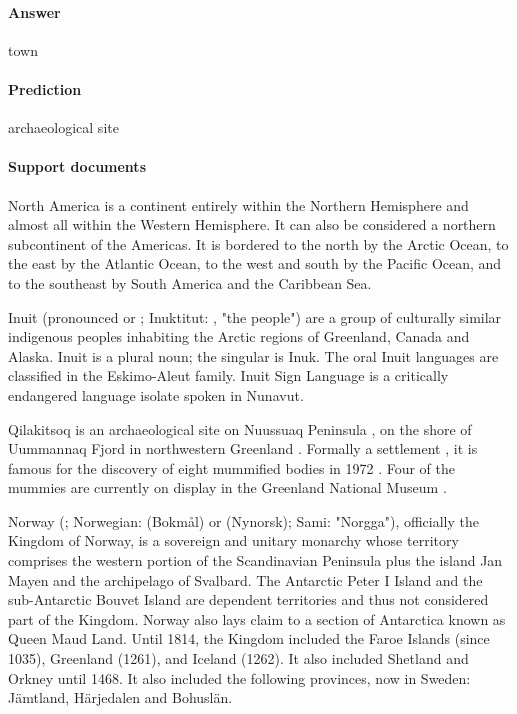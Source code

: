 \documentclass{article} \usepackage{iclr2019_conference,times}
\begin{document}
\paragraph{Answer} town

\paragraph{Prediction} archaeological site

\paragraph{Support documents}

North America is a continent entirely within the Northern Hemisphere and almost all within the Western Hemisphere. It can also be considered a northern subcontinent of the Americas. It is bordered to the north by the Arctic Ocean, to the east by the Atlantic Ocean, to the west and south by the Pacific Ocean, and to the southeast by South America and the Caribbean Sea.

Inuit (pronounced or ; Inuktitut: , "the people") are a group of culturally similar indigenous peoples inhabiting the Arctic regions of Greenland, Canada and Alaska. Inuit is a plural noun; the singular is Inuk. The oral Inuit languages are classified in the Eskimo-Aleut family. Inuit Sign Language is a critically endangered language isolate spoken in Nunavut.

Qilakitsoq is an archaeological site on Nuussuaq Peninsula , on the shore of Uummannaq Fjord in northwestern Greenland . Formally a settlement , it is famous for the discovery of eight mummified bodies in 1972 . Four of the mummies are currently on display in the Greenland National Museum .

Norway (; Norwegian: (Bokmål) or (Nynorsk); Sami: "Norgga"), officially the Kingdom of Norway, is a sovereign and unitary monarchy whose territory comprises the western portion of the Scandinavian Peninsula plus the island Jan Mayen and the archipelago of Svalbard. The Antarctic Peter I Island and the sub-Antarctic Bouvet Island are dependent territories and thus not considered part of the Kingdom. Norway also lays claim to a section of Antarctica known as Queen Maud Land. Until 1814, the Kingdom included the Faroe Islands (since 1035), Greenland (1261), and Iceland (1262). It also included Shetland and Orkney until 1468. It also included the following provinces, now in Sweden: Jämtland, Härjedalen and Bohuslän.
\end{document}
